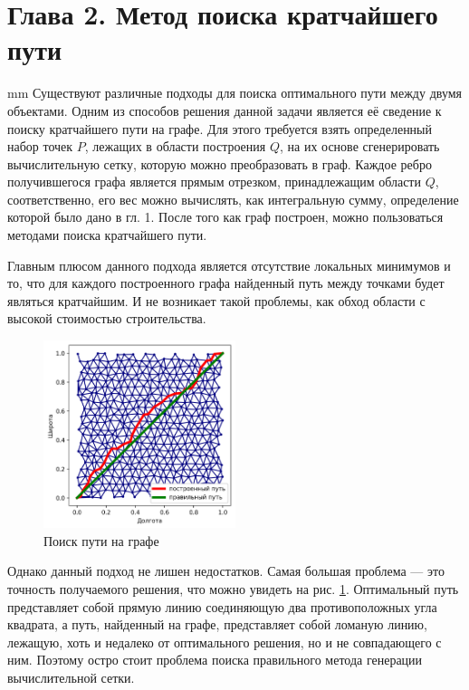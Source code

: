 \newpage
\section*{\LARGE{Глава 2. Метод поиска кратчайшего пути}}
 mm
Существуют различные подходы для поиска оптимального пути между двумя объектами. Одним из способов решения данной задачи является её сведение к поиску кратчайшего пути на графе. Для этого требуется взять определенный набор точек $P$, лежащих в области построения $Q$, на их основе сгенерировать вычислительную сетку, которую можно преобразовать в граф. Каждое ребро получившегося графа является прямым отрезком, принадлежащим области $Q$, соответственно, его вес можно вычислять, как интегральную сумму, определение которой было дано в гл. 1. После того как граф построен, можно пользоваться методами поиска кратчайшего пути.
\par
Главным плюсом данного подхода является отсутствие локальных минимумов и то, что для каждого построенного графа найденный путь между точками будет являться кратчайшим. И не возникает такой проблемы, как обход области с высокой стоимостью строительства.  
\begin{figure}[H]
	\includegraphics[width=0.5\textwidth]{images/2_2.png}
	\caption{Поиск пути на графе}
	\label{pic:graph_path}
\end{figure}
\vskip 4mm
\par
Однако данный подход не лишен недостатков. Самая большая проблема --- это точность получаемого решения, что можно увидеть на рис. \ref{pic:graph_path}. Оптимальный путь представляет собой прямую линию соединяющую два противоположных угла квадрата, а путь, найденный на графе, представляет собой ломаную линию, лежащую, хоть и недалеко от оптимального решения, но и не совпадающего с ним. Поэтому остро стоит проблема поиска правильного метода генерации вычислительной сетки.
